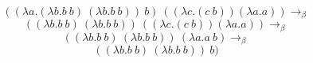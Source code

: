 \documentclass[12pt]{article}
\begin{document}
\Large
$$((\lambda a.(\lambda b.b\ b)\ (\lambda b.b\ b))\ b)\ ((\lambda c.(c\ b))(\lambda a.a))\to_\beta$$
$$((\lambda b.b\ b)\ (\lambda b.b\ b))\ ((\lambda c.(c\ b))(\lambda a.a))\to_\beta$$
$$((\lambda b.b\ b)\ (\lambda b.b\ b))\ (\lambda a.a\ b)\to_\beta$$
$$((\lambda b.b\ b)\ (\lambda b.b\ b))\ b)$$
\end{document}
